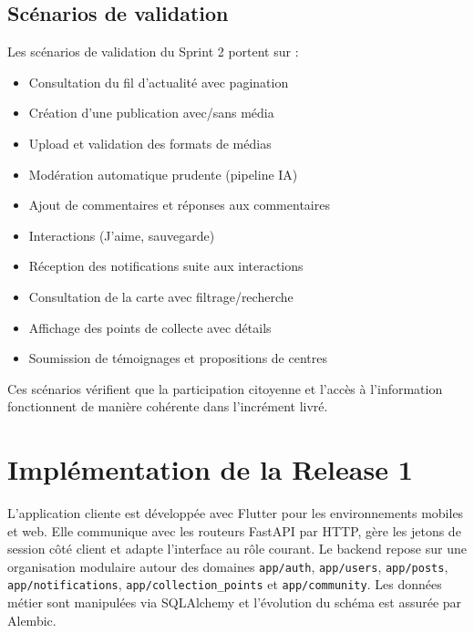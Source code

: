 \label{fig:r1_s2_class}

\subsection{Scénarios de validation}

Les scénarios de validation du Sprint 2 portent sur :
\begin{itemize}
    \item Consultation du fil d'actualité avec pagination
    \item Création d'une publication avec/sans média
    \item Upload et validation des formats de médias
    \item Modération automatique prudente (pipeline IA)
    \item Ajout de commentaires et réponses aux commentaires
    \item Interactions (J'aime, sauvegarde)
    \item Réception des notifications suite aux interactions
    \item Consultation de la carte avec filtrage/recherche
    \item Affichage des points de collecte avec détails
    \item Soumission de témoignages et propositions de centres
\end{itemize}

Ces scénarios vérifient que la participation citoyenne et l'accès à l'information fonctionnent de manière cohérente dans l'incrément livré.

\section{Implémentation de la Release 1}
\label{sec:r1_implementation}

L'application cliente est développée avec Flutter pour les environnements mobiles et web. Elle communique avec les routeurs FastAPI par HTTP, gère les jetons de session côté client et adapte l'interface au rôle courant. Le backend repose sur une organisation modulaire autour des domaines \texttt{app/auth}, \texttt{app/users}, \texttt{app/posts}, \texttt{app/notifications}, \texttt{app/collection\_points} et \texttt{app/community}. Les données métier sont manipulées via SQLAlchemy et l'évolution du schéma est assurée par Alembic.

